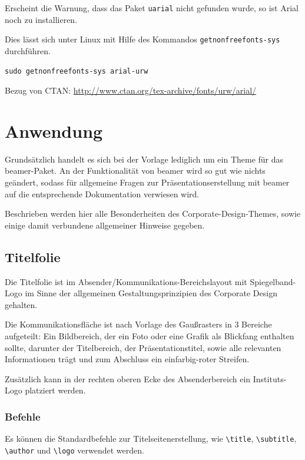 \documentclass[a4paper,colorscheme=green,TUBStitlepage=picture]{tubsreprt}
\begin{document}
Erscheint die Warnung, dass das Paket \lstinline{uarial} nicht gefunden wurde,
so ist Arial noch zu installieren.

Dies lässt sich unter Linux mit Hilfe des Kommandos
\lstinline{getnonfreefonts-sys} durchführen.

\begin{lstlisting}
sudo getnonfreefonts-sys arial-urw
\end{lstlisting}

Bezug von CTAN: \url{http://www.ctan.org/tex-archive/fonts/urw/arial/}

\chapter{Anwendung}

Grundsätzlich handelt es sich bei der Vorlage lediglich um ein Theme für
das beamer-Paket. An der Funktionalität von beamer wird so gut wie nichts
geändert, sodass für allgemeine Fragen zur Präsentationserstellung mit beamer
auf die entsprechende Dokumentation verwiesen wird. %

Beschrieben werden hier alle Besonderheiten des Corporate-Design-Themes, sowie
einige damit verbundene allgemeiner Hinweise gegeben.



\section{Titelfolie}

Die Titelfolie ist im Absender/Kommunikations-Bereichslayout mit
Spiegelband-Logo im Sinne der allgemeinen Gestaltungsprinzipien des
Corporate Design gehalten.

Die Kommunikationsfläche ist nach Vorlage des Gaußrasters %
in 3 Bereiche aufgeteilt:
Ein Bildbereich, der ein Foto oder eine Grafik als Blickfang enthalten
sollte,
darunter der Titelbereich, der Präsentationstitel, sowie alle relevanten
Informationen trägt
und zum Abschluss ein einfarbig-roter Streifen.

Zusätzlich kann in der rechten oberen Ecke des Absenderbereich ein
Instituts-Logo platziert werden.

\subsection{Befehle}

Es können die Standardbefehle zur Titelseitenerstellung, wie
\lstinline{\title},
\lstinline{\subtitle},
\lstinline{\author}
und \lstinline{\logo} verwendet werden.
\end{document}
